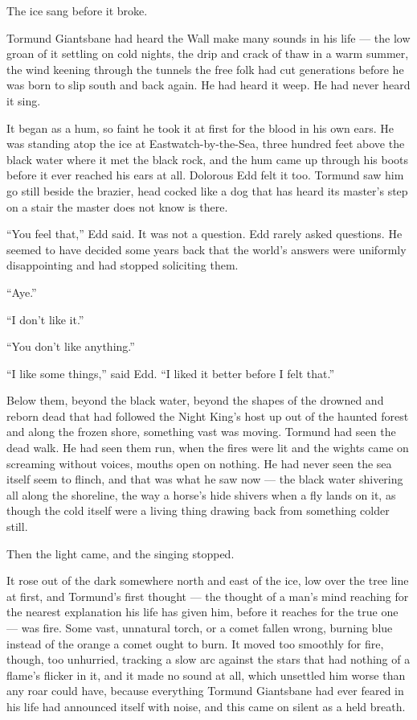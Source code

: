 The ice sang before it broke.

Tormund Giantsbane had heard the Wall make many sounds in his life — the low groan of it settling on cold nights, the drip and crack of thaw in a warm summer, the wind keening through the tunnels the free folk had cut generations before he was born to slip south and back again. He had heard it weep. He had never heard it sing.

It began as a hum, so faint he took it at first for the blood in his own ears. He was standing atop the ice at Eastwatch-by-the-Sea, three hundred feet above the black water where it met the black rock, and the hum came up through his boots before it ever reached his ears at all. Dolorous Edd felt it too. Tormund saw him go still beside the brazier, head cocked like a dog that has heard its master’s step on a stair the master does not know is there.

“You feel that,” Edd said. It was not a question. Edd rarely asked questions. He seemed to have decided some years back that the world’s answers were uniformly disappointing and had stopped soliciting them.

“Aye.”

“I don’t like it.”

“You don’t like anything.”

“I like some things,” said Edd. “I liked it better before I felt that.”

Below them, beyond the black water, beyond the shapes of the drowned and reborn dead that had followed the Night King’s host up out of the haunted forest and along the frozen shore, something vast was moving. Tormund had seen the dead walk. He had seen them run, when the fires were lit and the wights came on screaming without voices, mouths open on nothing. He had never seen the sea itself seem to flinch, and that was what he saw now — the black water shivering all along the shoreline, the way a horse’s hide shivers when a fly lands on it, as though the cold itself were a living thing drawing back from something colder still.

Then the light came, and the singing stopped.

It rose out of the dark somewhere north and east of the ice, low over the tree line at first, and Tormund’s first thought — the thought of a man’s mind reaching for the nearest explanation his life has given him, before it reaches for the true one — was fire. Some vast, unnatural torch, or a comet fallen wrong, burning blue instead of the orange a comet ought to burn. It moved too smoothly for fire, though, too unhurried, tracking a slow arc against the stars that had nothing of a flame’s flicker in it, and it made no sound at all, which unsettled him worse than any roar could have, because everything Tormund Giantsbane had ever feared in his life had announced itself with noise, and this came on silent as a held breath.

